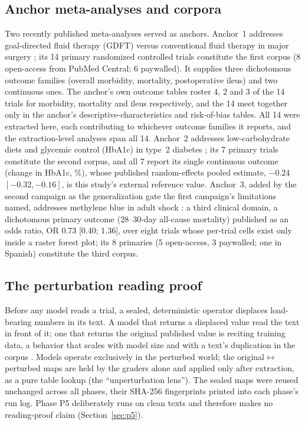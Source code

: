 \documentclass[11pt]{article}
\begin{document}
\subsection{Anchor meta-analyses and corpora}
Two recently published meta-analyses served as anchors. Anchor~1 addresses goal-directed fluid therapy (GDFT) versus conventional fluid therapy in major surgery \citep{ashraf2026gdft}; its 14 primary randomized controlled trials constitute the first corpus (8 open-access from PubMed Central; 6 paywalled). It supplies three dichotomous outcome families (overall morbidity, mortality, postoperative ileus) and two continuous ones. The anchor's own outcome tables roster 4, 2 and 3 of the 14 trials for morbidity, mortality and ileus respectively, and the 14 meet together only in the anchor's descriptive-characteristics and risk-of-bias tables. All 14 were extracted here, each contributing to whichever outcome families it reports, and the extraction-level analyses span all 14. Anchor~2 addresses low-carbohydrate diets and glycemic control (HbA1c) in type~2 diabetes \citep{khraise2026lowcarb}; its 7 primary trials constitute the second corpus, and all 7 report its single continuous outcome (change in HbA1c, \%), whose published random-effects pooled estimate, $-0.24$ $[-0.32, -0.16]$, is this study's external reference value. Anchor~3, added by the second campaign as the generalization gate the first campaign's limitations named, addresses methylene blue in adult shock \citep{rodriguezlima2026methylene}: a third clinical domain, a dichotomous primary outcome (28--30-day all-cause mortality) published as an odds ratio, OR 0.73 [0.40; 1.36], over eight trials whose per-trial cells exist only inside a raster forest plot; its 8 primaries (5 open-access, 3 paywalled; one in Spanish) constitute the third corpus.

\subsection{The perturbation reading proof}
Before any model reads a trial, a sealed, deterministic operator displaces load-bearing numbers in its text. A model that returns a displaced value read the text in front of it; one that returns the original published value is reciting training data, a behavior that scales with model size and with a text's duplication in the corpus \citep{carlini2023memorization,xu2024contamination}. Models operate exclusively in the perturbed world; the original$\leftrightarrow$perturbed maps are held by the graders alone and applied only after extraction, as a pure table lookup (the ``unperturbation lens''). The sealed maps were reused unchanged across all phases, their SHA-256 fingerprints printed into each phase's run log. Phase P5 deliberately runs on clean texts and therefore makes no reading-proof claim (Section~\ref{sec:p5}).
\end{document}
